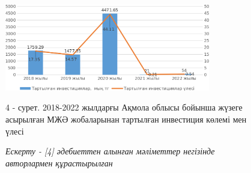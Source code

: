 \begin{figure}[H]
	\centering
	\includegraphics[width=0.8\textwidth]{assets/340.6}
	\caption*{4 - сурет. 2018-2022 жылдарғы Ақмола облысы бойынша жүзеге
асырылған МЖӘ жобаларынан тартылған инвестиция көлемі мен үлесі}
    \caption*{\normalfont \emph{Ескерту - {[}4{]} әдебиеттен алынған мәліметтер негізінде авторлармен құрастырылған}}
\end{figure}

